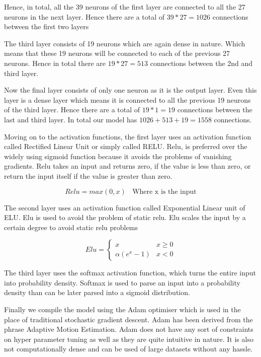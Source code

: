 \documentclass[12pt]{article}
\newcommand{\nd}{\noindent}
\begin{document}
\nd Hence, in total, all the 39 neurons of the first layer are connected to all the 27 neurons in the next layer. Hence there are a total of $39*27=1026$ connections between the first two layers

\nd The third layer consists of 19 neurons which are again dense in nature. Which means that these 19 neurons will be connected to each of the previous 27 neurons. Hence in total there are $19*27=513$  connections between the 2nd and third layer. 

\nd Now the final layer consists of only one neuron as it is the output layer. Even this layer is a dense layer which means it is connected to all the previous 19 neurons of the third layer. Hence there are a total of $19*1=19$ connections between the last and third layer. In total our model has $1026+513+19=1558$ connections. 

\nd Moving on to the activation functions, the first layer uses an activation function called Rectified Linear Unit or simply called RELU. Relu, is preferred over the widely using sigmoid function because it avoids the problems of vanishing gradients. Relu takes an input and returns zero, if the value is less than zero, or return the input itself if the value is greater than zero. 

\begin{equation}
Relu = max(0,x)  \,\,\,\,\ \text{Where x is the input}
\end{equation}

\nd The second layer uses an activation function called Exponential Linear unit of ELU. Elu is used to avoid the problem of static relu. Elu scales the input by a certain degree to avoid static relu problems 

\begin{equation}
Elu = 
\begin{cases}
x & x\geq 0 \\
\alpha(e^{x}-1) & x < 0
\end{cases}
\end{equation}

\nd The third layer uses the softmax activation function, which turns the entire input into probability density. Softmax is used to parse an input into a probability density than can be later parsed into a sigmoid distribution. 

\nd Finally we compile the model using the Adam optimiser which is used in the place of traditional stochastic gradient descent. Adam has been derived from the phrase Adaptive Motion Estimation. Adam does not have any sort of constraints on hyper parameter tuning as well as they are quite intuitive in nature. It is also not computationally  dense and can be used of large datasets without any hassle. 
\end{document}
